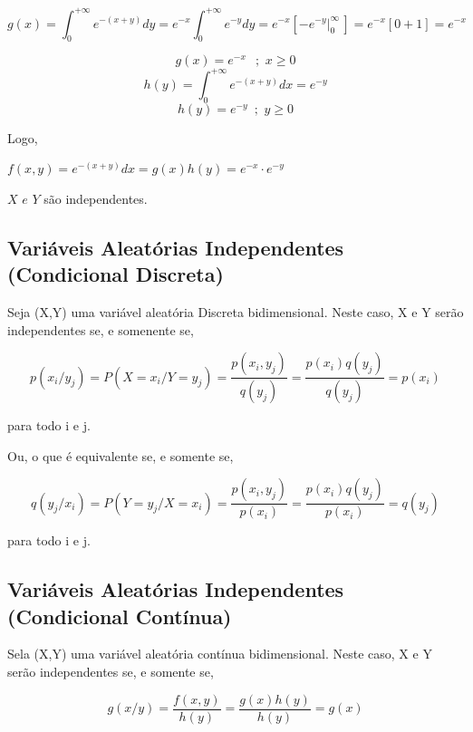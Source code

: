 \documentclass[a4paper,12pt]{report}
\begin{document}
{$$g(x)=\int^{+\infty}_{0}e^{-(x+y)}dy =
e^{-x}\int^{+\infty}_{0}e^{-y}dy =
e^{-x}\left[-e^{-y}\biggl|^{\infty}_{0}\,\right]=
e^{-x}\left[0+1\right]= e^{-x} $$

$$g(x)= e^{-x} \,\,\,\ ;\,\, x\geq 0$$
\vspace{0,3cm}
$$h(y)= \int^{+\infty}_{0}e^{-(x+y)}dx= e^{-y}$$
$$h(y)= e^{-y}\,\,\, ;\,\, y\geq 0$$
\par Logo,
\vspace{0,2cm}
\par $f(x,y)= e^{-(x+y)}dx = g(x)h(y)= e^{-x}\cdot e^{-y}$
\vspace{0,2cm}
\par $X\,\, e\,\, Y$ são independentes.
\vspace{0,5cm}



\subsection{Variáveis Aleatórias Independentes (Condicional Discreta)}

Seja (X,Y) uma variável aleatória Discreta bidimensional. Neste
caso, X e Y serão independentes se, e somenente se,

\begin{equation}\label{}
    p(x_{i}/y_{j})=P(X=x_{i}/Y=y_{j})=\frac{p(x_{i},y_{j})}{q(y_{j})}=\frac{p(x_{i})q(y_{j})}{q(y_{j})}=p(x_{i})
\end{equation}

para todo i e j. \vskip0.3cm


Ou, o que é equivalente se, e somente se,


\begin{equation}\label{}
    q(y_{j}/x_{i})=P(Y=y_{j}/X=x_{i})=\frac{p(x_{i},y_{j})}{p(x_{i})}=\frac{p(x_{i})q(y_{j})}{p(x_{i})}=q(y_{j})
\end{equation}

para todo i e j.

\subsection{Variáveis Aleatórias Independentes (Condicional Contínua)}

Sela (X,Y) uma variável aleatória contínua bidimensional. Neste
caso, X e Y serão independentes se, e somente se,


\begin{equation}\label{}
    g(x/y) =\frac{f(x,y)}{h(y)} =\frac{g(x)h(y)}{h(y)}=g(x)
\end{equation}

}
\end{document}
